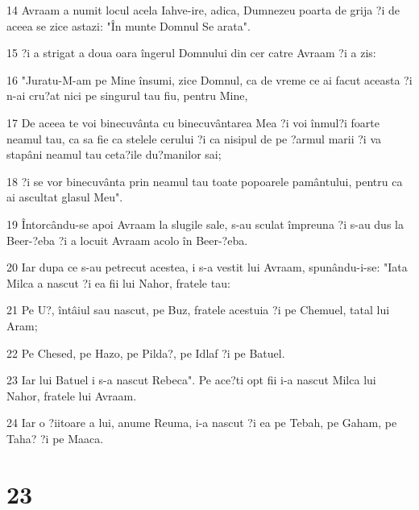\par 14 Avraam a numit locul acela Iahve-ire, adica, Dumnezeu poarta de grija ?i de aceea se zice astazi: "În munte Domnul Se arata".
\par 15 ?i a strigat a doua oara îngerul Domnului din cer catre Avraam ?i a zis:
\par 16 "Juratu-M-am pe Mine însumi, zice Domnul, ca de vreme ce ai facut aceasta ?i n-ai cru?at nici pe singurul tau fiu, pentru Mine,
\par 17 De aceea te voi binecuvânta cu binecuvântarea Mea ?i voi înmul?i foarte neamul tau, ca sa fie ca stelele cerului ?i ca nisipul de pe ?armul marii ?i va stapâni neamul tau ceta?ile du?manilor sai;
\par 18 ?i se vor binecuvânta prin neamul tau toate popoarele pamântului, pentru ca ai ascultat glasul Meu".
\par 19 Întorcându-se apoi Avraam la slugile sale, s-au sculat împreuna ?i s-au dus la Beer-?eba ?i a locuit Avraam acolo în Beer-?eba.
\par 20 Iar dupa ce s-au petrecut acestea, i s-a vestit lui Avraam, spunându-i-se: "Iata Milca a nascut ?i ea fii lui Nahor, fratele tau:
\par 21 Pe U?, întâiul sau nascut, pe Buz, fratele acestuia ?i pe Chemuel, tatal lui Aram;
\par 22 Pe Chesed, pe Hazo, pe Pilda?, pe Idlaf ?i pe Batuel.
\par 23 Iar lui Batuel i s-a nascut Rebeca". Pe ace?ti opt fii i-a nascut Milca lui Nahor, fratele lui Avraam.
\par 24 Iar o ?iitoare a lui, anume Reuma, i-a nascut ?i ea pe Tebah, pe Gaham, pe Taha? ?i pe Maaca.

\chapter{23}

